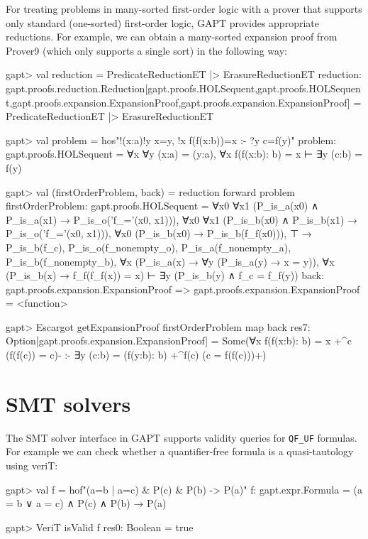 \documentclass[a4paper,11pt]{book}
\begin{document}
For treating problems in many-sorted first-order logic with a prover that supports only
standard (one-sorted) first-order logic, GAPT provides appropriate reductions.
For example, we can obtain a many-sorted expansion proof from Prover9
(which only supports a single sort) in the following way:
\begin{clilisting}
gapt> val reduction = PredicateReductionET |> ErasureReductionET
reduction: gapt.proofs.reduction.Reduction[gapt.proofs.HOLSequent,gapt.proofs.HOLSequent,gapt.proofs.expansion.ExpansionProof,gapt.proofs.expansion.ExpansionProof] = PredicateReductionET |> ErasureReductionET

gapt> val problem = hos"!(x:a)!y x=y, !x f(f(x:b))=x :- ?y c=f(y)"
problem: gapt.proofs.HOLSequent = ∀x ∀y (x:a) = (y:a), ∀x f(f(x:b): b) = x ⊢ ∃y (c:b) = f(y)

gapt> val (firstOrderProblem, back) = reduction forward problem
firstOrderProblem: gapt.proofs.HOLSequent =
∀x0 ∀x1 (P_is_a(x0) ∧ P_is_a(x1) → P_is_o('f_='(x0, x1))),
∀x0 ∀x1 (P_is_b(x0) ∧ P_is_b(x1) → P_is_o('f_='(x0, x1))),
∀x0 (P_is_b(x0) → P_is_b(f_f(x0))),
⊤ → P_is_b(f_c),
P_is_o(f_nonempty_o),
P_is_a(f_nonempty_a),
P_is_b(f_nonempty_b),
∀x (P_is_a(x) → ∀y (P_is_a(y) → x = y)),
∀x (P_is_b(x) → f_f(f_f(x)) = x)
⊢
∃y (P_is_b(y) ∧ f_c = f_f(y))
back: gapt.proofs.expansion.ExpansionProof => gapt.proofs.expansion.ExpansionProof = <function>

gapt> Escargot getExpansionProof firstOrderProblem map back
res7: Option[gapt.proofs.expansion.ExpansionProof] =
Some(∀x f(f(x:b): b) = x +^{c} (f(f(c)) = c)-
:-
∃y (c:b) = (f(y:b): b) +^{f(c)} (c = f(f(c)))+)

\end{clilisting}

\section{SMT solvers}

The SMT solver interface in GAPT supports validity queries for \verb,QF_UF,
formulas.  For example we can check whether a quantifier-free formula is a
quasi-tautology using veriT:
\begin{clilisting}
gapt> val f = hof"(a=b | a=c) & P(c) & P(b) -> P(a)"
f: gapt.expr.Formula = (a = b ∨ a = c) ∧ P(c) ∧ P(b) → P(a)

\end{clilisting}

\begin{clilisting}
gapt> VeriT isValid f
res0: Boolean = true

\end{clilisting}
\end{document}
